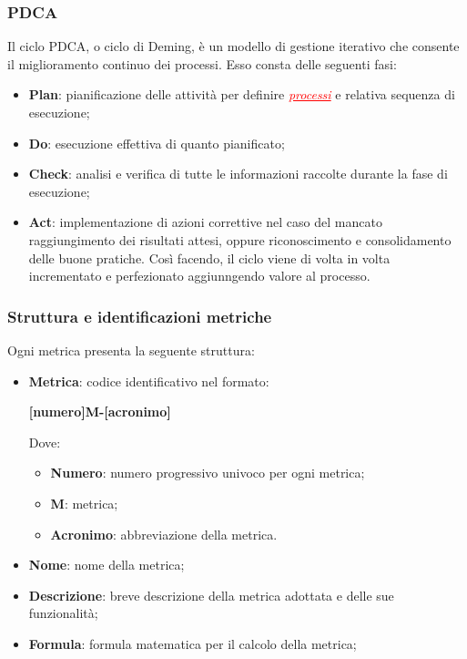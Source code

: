 \subsubsection{PDCA}
Il ciclo PDCA, o ciclo di Deming, è un modello di gestione iterativo che consente il miglioramento continuo dei processi. Esso consta delle seguenti fasi:
\begin{itemize}
    \item \textbf{Plan}: pianificazione delle attività per definire \textcolor{red}{\uline{\textit{processi}}} e relativa sequenza di esecuzione;
    \item \textbf{Do}: esecuzione effettiva di quanto pianificato;
    \item \textbf{Check}: analisi e verifica di tutte le informazioni raccolte durante la fase di esecuzione;
    \item \textbf{Act}: implementazione di azioni correttive nel caso del mancato raggiungimento dei risultati attesi, oppure riconoscimento e 
    consolidamento delle buone pratiche. Così facendo, il ciclo viene di volta in volta incrementato e perfezionato aggiunngendo valore al processo.
\end{itemize}

\subsubsection{Struttura e identificazioni metriche}
Ogni metrica presenta la seguente struttura:
\begin{itemize}
    \item \textbf{Metrica}:
    codice identificativo nel formato:
    \begin{center}
        \textbf{[numero]M-[acronimo]}
    \end{center}
    Dove:
    \begin{itemize}
        \item \textbf{Numero}: numero progressivo univoco per ogni metrica;
        \item \textbf{M}: metrica;
        \item \textbf{Acronimo}: abbreviazione della metrica.
    \end{itemize}
    \item \textbf{Nome}: nome della metrica;
    \item \textbf{Descrizione}: breve descrizione della metrica adottata e delle sue funzionalità;
    \item \textbf{Formula}: formula matematica per il calcolo della metrica;
\end{itemize}

